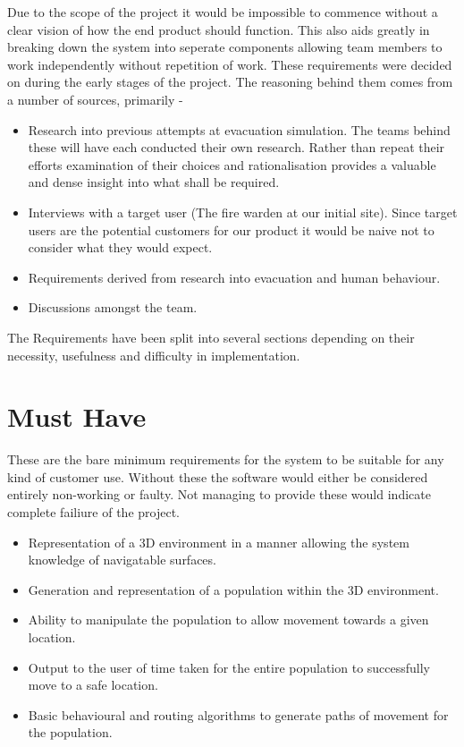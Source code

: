 



Due to the scope of the project it would be impossible to commence
without a clear vision of how the end product should function. This
also aids greatly in breaking down the system into seperate components
allowing team members to work independently without repetition of
work. These requirements were decided on during the early stages of
the project. The reasoning behind them comes from a number of sources,
primarily -
\begin{itemize}
\item Research into previous attempts at evacuation simulation. The teams
behind these will have each conducted their own research. Rather than
repeat their efforts examination of their choices and rationalisation
provides a valuable and dense insight into what shall be required.
\item Interviews with a target user (The fire warden at our initial site).
Since target users are the potential customers for our product it
would be naive not to consider what they would expect.
\item Requirements derived from research into evacuation and human behaviour.
\item Discussions amongst the team.
\end{itemize}
The Requirements have been split into several sections depending on
their necessity, usefulness and difficulty in implementation.


\section{Must Have}

These are the bare minimum requirements for the system to be suitable
for any kind of customer use. Without these the software would either
be considered entirely non-working or faulty. Not managing to provide
these would indicate complete failiure of the project.
\begin{itemize}
\item Representation of a 3D environment in a manner allowing the system
knowledge of navigatable surfaces.
\item Generation and representation of a population within the 3D environment.
\item Ability to manipulate the population to allow movement towards a given
location.
\item Output to the user of time taken for the entire population to successfully
move to a safe location.
\item Basic behavioural and routing algorithms to generate paths of movement
for the population.
\end{itemize}


